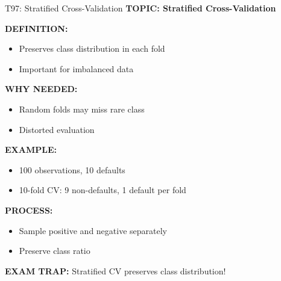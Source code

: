 \documentclass[8pt]{beamer}
\begin{document}
	\begin{frame}{T97: Stratified Cross-Validation}
		\fontsize{6.5}{7.5}\selectfont
		\textbf{TOPIC: Stratified Cross-Validation}
		
		\vspace{0.1cm}
		\textbf{DEFINITION:}
		\begin{itemize}
			\item Preserves class distribution in each fold
			\item Important for imbalanced data
		\end{itemize}
		
		\vspace{0.1cm}
		\textbf{WHY NEEDED:}
		\begin{itemize}
			\item Random folds may miss rare class
			\item Distorted evaluation
		\end{itemize}
		
		\vspace{0.1cm}
		\textbf{EXAMPLE:}
		\begin{itemize}
			\item 100 observations, 10 defaults
			\item 10-fold CV: 9 non-defaults, 1 default per fold
		\end{itemize}
		
		\vspace{0.1cm}
		\textbf{PROCESS:}
		\begin{itemize}
			\item Sample positive and negative separately
			\item Preserve class ratio
		\end{itemize}
		
		\textcolor{myred}{\textbf{EXAM TRAP:}} Stratified CV preserves \textcolor{myblue}{class distribution}!
	\end{frame}
	
\end{document}
